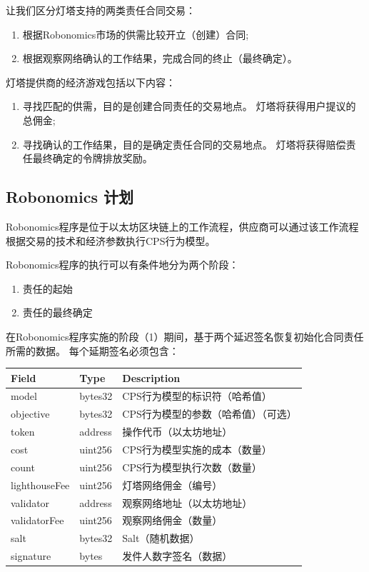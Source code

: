 \documentclass[UTF8]{article}
\begin{document}
让我们区分灯塔支持的两类责任合同交易：

\begin{enumerate}
	\item 根据Robonomics市场的供需比较开立（创建）合同;
	\item 根据观察网络确认的工作结果，完成合同的终止（最终确定）。
\end{enumerate}

灯塔提供商的经济游戏包括以下内容：

\begin{enumerate}
	\item 寻找匹配的供需，目的是创建合同责任的交易地点。 灯塔将获得用户提议的总佣金;
	\item 寻找确认的工作结果，目的是确定责任合同的交易地点。 灯塔将获得赔偿责任最终确定的令牌排放奖励。
\end{enumerate}

\subsection{Robonomics 计划}

Robonomics程序是位于以太坊区块链上的工作流程，供应商可以通过该工作流程根据交易的技术和经济参数执行CPS行为模型。

Robonomics程序的执行可以有条件地分为两个阶段：

\begin{enumerate}
	\item 责任的起始
	\item 责任的最终确定
\end{enumerate}

在Robonomics程序实施的阶段（1）期间，基于两个延迟签名恢复初始化合同责任所需的数据。 每个延期签名必须包含：
\newline
\newline

\begin{tabular}{ |l |l |l }
 \textbf{Field} & \textbf{Type} & \textbf{Description} \\ 
 \hline
 model & bytes32 & CPS行为模型的标识符（哈希值） \\  
 objective & bytes32 & CPS行为模型的参数（哈希值）（可选） \\
 token & address & 操作代币（以太坊地址） \\
 cost & uint256 & CPS行为模型实施的成本（数量） \\
 count & uint256 & CPS行为模型执行次数（数量） \\
 lighthouseFee & uint256 & 灯塔网络佣金（编号） \\
 validator & address & 观察网络地址（以太坊地址） \\
 validatorFee & uint256 & 观察网络佣金（数量） \\
 salt & bytes32 & Salt（随机数据） \\
 signature & bytes & 发件人数字签名（数据） \\
\end{tabular}
\end{document}
